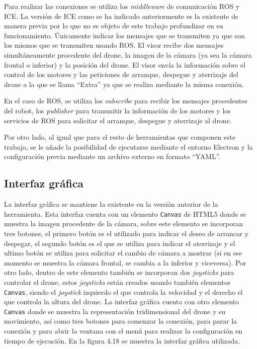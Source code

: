 Para realizar las conexiones se utiliza los \textit{middleware} de comunicación ROS y ICE. La versión de ICE como se ha indicado anteriormente es la existente de manera previa por lo que no es objeto de este trabajo profundizar en su funcionamiento. Únicamente indicar los mensajes que se transmiten ya que son los mismos que se transmiten usando ROS. El visor recibe dos mensajes simultáneamente procedente del drone, la imagen de la cámara (ya sea la cámara frontal o inferior) y la posición del drone. El visor envía la información sobre el control de los motores y las peticiones de arranque, despegue y aterrizaje del drone a la que se llama ``Extra'' ya que se realiza mediante la misma conexión.

En el caso de ROS, se utiliza los \textit{subscribe} para recibir los mensajes procedentes del robot, los \textit{publisher} para transmitir la información de los motores y los servicios de ROS para solicitar el arranque, despegue y aterrizaje al drone.

Por otro lado, al igual que para el resto de herramientas que componen este trabajo, se le añade la posibilidad de ejecutarse mediante el entorno Electron y la configuración previa mediante un archivo externo en formato ``YAML''.

\subsection{Interfaz gráfica}

La interfaz gráfica se mantiene la existente en la versión anterior de la herramienta. Esta interfaz cuenta con un elemento \texttt{Canvas} de HTML5 donde se muestra la imagen procedente de la cámara, sobre este elemento se incorporan tres botones, el primero botón es el utilizado para indicar el deseo de arrancar y despegar, el segundo botón es el que se utiliza para indicar el aterrizaje y el ultimo botón se utiliza para solicitar el cambio de cámara a mostrar (si en ese momento se muestra la cámara frontal, se cambia a la inferior y viceversa). Por otro lado, dentro de este elemento también se incorporan dos \textit{joysticks} para controlar el drone, estos \textit{joysticks} están creados usando también elementos \texttt{Canvas}, siendo el \textit{joystick} izquierdo el que controla la velocidad y el derecho el que controla la altura del drone. La interfaz gráfica cuenta con otro elemento \texttt{Canvas} donde se muestra la representación tridimensional del drone y su movimiento, así como tres botones para comenzar la conexión, para parar la conexión y para abrir la ventana con el menú para realizar la configuración en tiempo de ejecución. En la figura 4.18 se muestra la interfaz gráfica utilizada.

